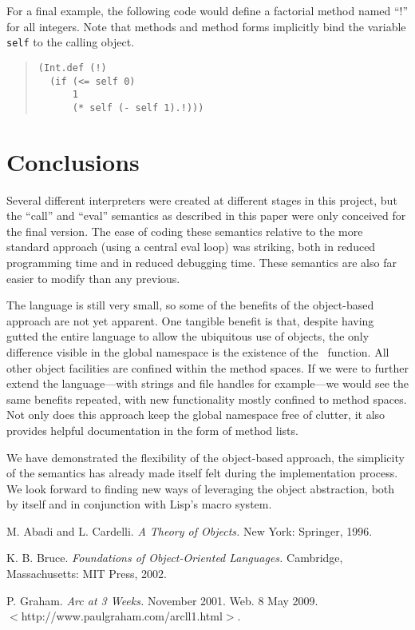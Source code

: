 \documentclass[twocolumn]{article}
\begin{document}
For a final example, the following code would define a factorial
method named ``!'' for all integers. Note that methods and method
forms implicitly bind the variable \texttt{self} to the calling
object.
\begin{quote}
\begin{verbatim}
(Int.def (!)
  (if (<= self 0)
      1
      (* self (- self 1).!)))
\end{verbatim}
\end{quote}

\section*{Conclusions}
Several different interpreters were created at different stages in
this project, but the ``call'' and ``eval'' semantics as described in
this paper were only conceived for the final version. The ease of
coding these semantics relative to the more standard approach (using a
central eval loop) was striking, both in reduced programming time and
in reduced debugging time. These semantics are also far easier to
modify than any previous.

The language is still very small, so some of the benefits of the
object-based approach are not yet apparent. One tangible benefit is
that, despite having gutted the entire language to allow the
ubiquitous use of objects, the only difference visible in the global
namespace is the existence of the \msg\ function. All other object
facilities are confined within the method spaces. If we were to
further extend the language---with strings and file handles for
example---we would see the same benefits repeated, with new
functionality mostly confined to method spaces. Not only does this
approach keep the global namespace free of clutter, it also provides
helpful documentation in the form of method lists.

We have demonstrated the flexibility of the object-based approach, the
simplicity of the semantics has already made itself felt during the
implementation process. We look forward to finding new ways of
leveraging the object abstraction, both by itself and in conjunction
with Lisp's macro system.

\begin{thebibliography}{9}
 M. Abadi and L. Cardelli. \textit{A Theory of Objects.} New
  York: Springer, 1996.

 K. B. Bruce. \textit{Foundations of Object-Oriented
    Languages.} Cambridge, Massachusetts: MIT Press, 2002.

 P. Graham. \textit{Arc at 3 Weeks.} November
  2001. Web. 8 May 2009.\\ $<$http://www.paulgraham.com/arcll1.html$>$.
\end{thebibliography}
\end{document}
